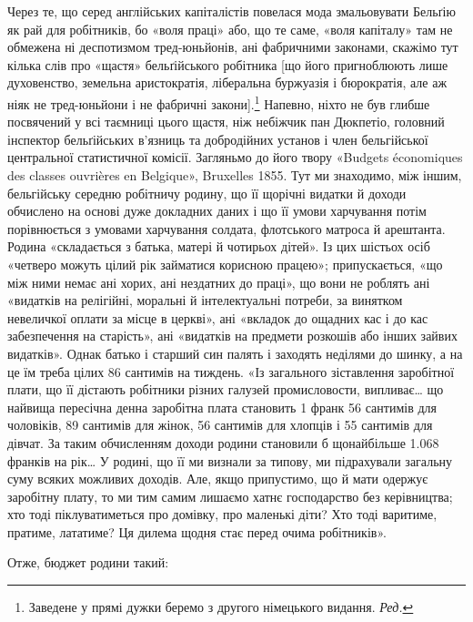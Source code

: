 Через те, що серед англійських капіталістів повелася мода
змальовувати Бельґію як рай для робітників, бо «воля праці»
або, що те саме, «воля капіталу» там не обмежена ні деспотизмом
тред-юньйонів, ані фабричними законами, скажімо тут кілька
слів про «щастя» бельґійського робітника [що його пригноблюють
лише духовенство, земельна аристократія, ліберальна буржуазія
і бюрократія, але аж ніяк не тред-юньйони і не фабричні закони].\footnote*{
Заведене у прямі дужки беремо з другого німецького видання. \emph{Ред.}
}
Напевно, ніхто не був глибше посвячений у всі таємниці
цього щастя, ніж небіжчик пан Дюкпетіо, головний інспектор
бельґійських в’язниць та добродійних установ і член бельгійської
центральної статистичної комісії. Загляньмо до його твору
«Budgets économiques des classes ouvrières en Belgique», Bruxelles
1855. Тут ми знаходимо, між іншим, бельгійську середню
робітничу родину, що її щорічні видатки й доходи обчислено
на основі дуже докладних даних і що її умови харчування потім
порівнюється з умовами харчування солдата, флотського матроса
й арештанта. Родина «складається з батька, матері й чотирьох
дітей». Із цих шістьох осіб «четверо можуть цілий рік займатися
корисною працею»; припускається, «що між ними немає ані
хорих, ані нездатних до праці», що вони не роблять ані «видатків
на релігійні, моральні й інтелектуальні потреби, за винятком
невеличкої оплати за місце в церкві», ані «вкладок до ощадних
кас і до кас забезпечення на старість», ані «видатків на предмети
розкошів або інших зайвих видатків». Однак батько і старший
син палять і заходять неділями до шинку, а на це їм треба цілих
86 сантимів на тиждень. «Із загального зіставлення заробітної
плати, що її дістають робітники різних галузей промисловости,
випливає\dots{} що найвища пересічна денна заробітна плата становить
1 франк 56 сантимів для чоловіків, 89 сантимів для жінок,
56 сантимів для хлопців і 55 сантимів для дівчат. За таким обчисленням
доходи родини становили б щонайбільше 1.068 франків
на рік\dots{} У родині, що її ми визнали за типову, ми підрахували
загальну суму всяких можливих доходів. Але, якщо припустимо,
що й мати одержує заробітну плату, то ми тим самим
лишаємо хатнє господарство без керівництва; хто тоді піклуватиметься
про домівку, про маленькі діти? Хто тоді варитиме, пратиме,
лататиме? Ця дилема щодня стає перед очима робітників».

Отже, бюджет родини такий:

